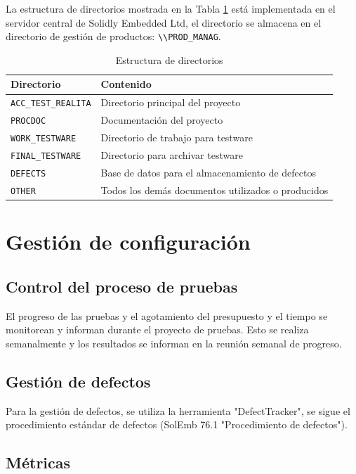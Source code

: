 \documentclass[12pt,a4paper, twoside]{article} %
\begin{document}
La estructura de directorios mostrada en la Tabla \ref{tab:directory_structure} está implementada en el servidor central de Solidly Embedded Ltd, el directorio se almacena en el directorio de gestión de productos: \texttt{\textbackslash\textbackslash PROD\_MANAG}.

\begin{table}[h]
\centering
\begin{tabular}{|l| l|}
\hline
\textbf{Directorio} & \textbf{Contenido} \\
\hline
\texttt{ACC\_TEST\_REALITA} & Directorio principal del proyecto \\
\texttt{PROCDOC} & Documentación del proyecto \\
\texttt{WORK\_TESTWARE} & Directorio de trabajo para testware \\
\texttt{FINAL\_TESTWARE} & Directorio para archivar testware \\
\texttt{DEFECTS} & Base de datos para el almacenamiento de defectos \\
\texttt{OTHER} & Todos los demás documentos utilizados o producidos \\
\hline
\end{tabular}
\caption{Estructura de directorios}
\label{tab:directory_structure}
\end{table}

\section{Gestión de configuración}

\subsection{Control del proceso de pruebas}

El progreso de las pruebas y el agotamiento del presupuesto y el tiempo se monitorean y informan durante el proyecto de pruebas. Esto se realiza semanalmente y los resultados se informan en la reunión semanal de progreso.

\subsection{Gestión de defectos}

Para la gestión de defectos, se utiliza la herramienta "DefectTracker", se sigue el procedimiento estándar de defectos (SolEmb 76.1 "Procedimiento de defectos").

\subsection{Métricas}
\end{document}
